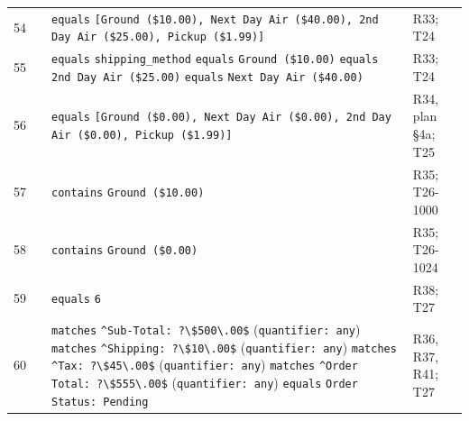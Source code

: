 {\begin{xltabular}{\linewidth}{@{}r >{\raggedright\arraybackslash}p{3.0cm} >{\raggedright\arraybackslash}X >{\raggedright\arraybackslash}p{2.4cm}@{}}
54 &  &  \texttt{equals} \texttt{[\textquotedbl{}Ground (\$10.00)\textquotedbl{}, \textquotedbl{}Next Day Air (\$40.00)\textquotedbl{}, \textquotedbl{}2nd Day Air (\$25.00)\textquotedbl{}, \textquotedbl{}Pickup (\$1.99)\textquotedbl{}]} & R33; T24 \\
55 &  &  \texttt{equals} \texttt{\textquotedbl{}shipping\_method\textquotedbl{}} \newline {} \texttt{equals} \texttt{\textquotedbl{}Ground (\$10.00)\textquotedbl{}} \newline {} \texttt{equals} \texttt{\textquotedbl{}2nd Day Air (\$25.00)\textquotedbl{}} \newline {} \texttt{equals} \texttt{\textquotedbl{}Next Day Air (\$40.00)\textquotedbl{}} & R33; T24 \\
56 &  &  \texttt{equals} \texttt{[\textquotedbl{}Ground (\$0.00)\textquotedbl{}, \textquotedbl{}Next Day Air (\$0.00)\textquotedbl{}, \textquotedbl{}2nd Day Air (\$0.00)\textquotedbl{}, \textquotedbl{}Pickup (\$1.99)\textquotedbl{}]} & R34, plan §4a; T25 \\
57 &  &  \texttt{contains} \texttt{\textquotedbl{}Ground (\$10.00)\textquotedbl{}} & R35; T26-1000 \\
58 &  &  \texttt{contains} \texttt{\textquotedbl{}Ground (\$0.00)\textquotedbl{}} & R35; T26-1024 \\
59 &  &  \texttt{equals} \texttt{6} & R38; T27 \\
60 &  &  \texttt{matches} \texttt{\textquotedbl{}\textasciicircum{}Sub-Total: ?\textbackslash{}\$500\textbackslash{}.00\$\textquotedbl{}} (\texttt{quantifier: any}) \newline {} \texttt{matches} \texttt{\textquotedbl{}\textasciicircum{}Shipping: ?\textbackslash{}\$10\textbackslash{}.00\$\textquotedbl{}} (\texttt{quantifier: any}) \newline {} \texttt{matches} \texttt{\textquotedbl{}\textasciicircum{}Tax: ?\textbackslash{}\$45\textbackslash{}.00\$\textquotedbl{}} (\texttt{quantifier: any}) \newline {} \texttt{matches} \texttt{\textquotedbl{}\textasciicircum{}Order Total: ?\textbackslash{}\$555\textbackslash{}.00\$\textquotedbl{}} (\texttt{quantifier: any}) \newline {} \texttt{equals} \texttt{\textquotedbl{}Order Status: Pending\textquotedbl{}} & R36, R37, R41; T27 \\

\end{xltabular}}

